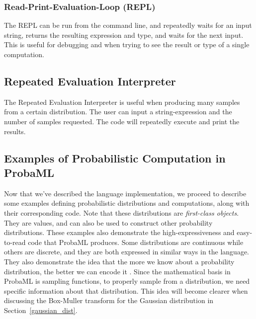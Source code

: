 \documentclass[pageno]{jpaper}
\begin{document}
\subsubsection{Read-Print-Evaluation-Loop (REPL)}
The REPL can be run from the command line, and repeatedly waits for an input string, returns the resulting expression and type, and waits for the next input. This is useful for debugging and when trying to see the result or type of a single computation.

\subsection{Repeated Evaluation Interpreter}
The Repeated Evaluation Interpreter is useful when producing many samples from a certain distribution. The user can input a string-expression and the number of samples requested. The code will repeatedly execute and print the results.

\subsection{Examples of Probabilistic Computation in ProbaML}
Now that we've described the language implementation, we proceed to describe some examples defining probabilistic distributions and computations, along with their corresponding code. Note that these distributions are \emph{first-class objects}. They are values, and can also be used to construct other probability distributions. These examples also demonstrate the high-expressiveness and easy-to-read code that ProbaML produces. Some distributions are continuous while others are discrete, and they are both expressed in similar ways in the language. They also demonstrate the idea that the more we know about a probability distribution,
the better we can encode it \cite{pfenning_short}. Since the mathematical basis in ProbaML is sampling functions, to properly sample from a distribution, we need specific information about that distribution. This idea will become clearer when discussing the Box-Muller transform for the Gaussian distribution in Section~\ref{gaussian_dist}.
\end{document}
